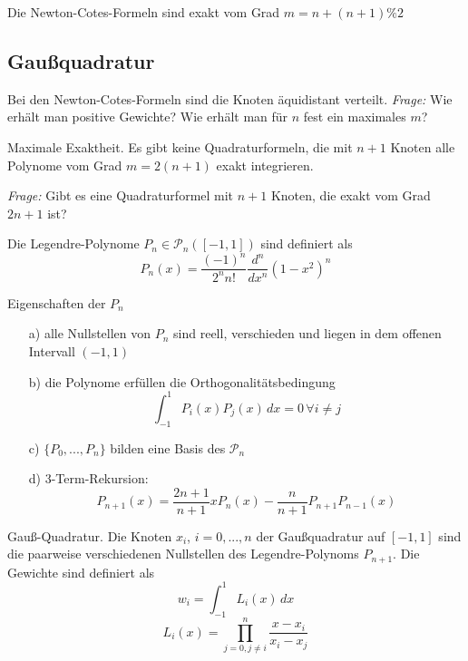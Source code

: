 \begin{theorem}[Satz I.4]
	Die Newton-Cotes-Formeln sind exakt vom Grad $m = n + (n+1)\%2$
\end{theorem}
	
	
\subsection{Gaußquadratur}

Bei den Newton-Cotes-Formeln sind die Knoten äquidistant verteilt. \emph{Frage:} Wie erhält man positive Gewichte? Wie erhält man für $n$ fest ein maximales $m$?

\begin{theorem}[Satz I.5] Maximale Exaktheit. Es gibt keine Quadraturformeln, die mit $n+1$ Knoten alle Polynome vom Grad $m = 2(n+1)$ exakt integrieren.\end{theorem} 	

\emph{Frage:} Gibt es eine Quadraturformel mit $n+1$ Knoten, die exakt vom Grad $2n+1$ ist?

\begin{definition}[Definition I.6] Die Legendre-Polynome $P_n \in \mathcal{P}_n ([-1,1])$ sind definiert als 
$$P_n(x) = \frac{(-1)^n}{2^n n!} \frac{d^n}{dx^n} (1-x^2)^n$$
\end{definition}

\begin{theorem}[Satz I.6] Eigenschaften der $P_n$
	\begin{itemize}
		\item[a)] alle Nullstellen von $P_n$ sind reell, verschieden und liegen in dem offenen Intervall $(-1, 1)$
		\item[b)] die Polynome erfüllen die Orthogonalitätsbedingung 
				$$\int_{-1}^1\!P_i(x) P_j(x)\,dx = 0\,\forall i \ne j$$
		\item[c)] $\{P_0, ..., P_n\}$ bilden eine Basis des $\mathcal{P}_n$
		\item[d)] 3-Term-Rekursion:
		$$P_{n+1}(x) = \frac{2n+1}{n+1} x P_n(x) - \frac{n}{n+1} P_{n+1} P_{n-1}(x)$$
	\end{itemize}
\end{theorem}

\begin{definition}[Definition I.7] Gauß-Quadratur. Die Knoten $x_i$, $i=0,...,n$ der Gaußquadratur auf $[-1, 1]$ sind die paarweise verschiedenen Nullstellen des Legendre-Polynoms $P_{n+1}$. Die Gewichte sind definiert als 
	$$w_i = \int^1_{-1}\!L_i(x) \,dx$$	
	$$L_i(x) = \prod_{j=0, j \ne i}^n \frac{x-x_i}{x_i-x_j}$$
\end{definition}


